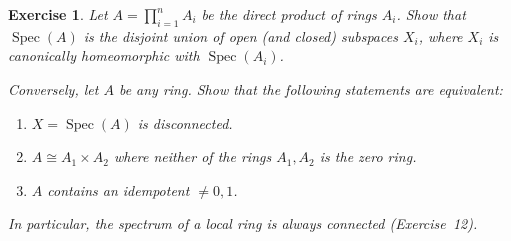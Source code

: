 \documentclass{article}
\theoremstyle{breakstyle}
\newtheorem{exercise}{Exercise}
\DeclareMathOperator{\spec}{Spec}
\begin{document}
\begin{exercise}
Let \(A=\prod_{i=1}^nA_i\) be the direct product of rings \(A_i\). Show that \(\spec(A)\) is the disjoint union of open (and closed) subspaces \(X_i\), where \(X_i\) is canonically homeomorphic with \(\spec(A_i)\).

Conversely, let \(A\) be any ring. Show that the following statements are equivalent:
\begin{enumerate}[label=(\roman*)]
    \item \(X=\spec(A)\) is disconnected.
    \item \(A\cong A_1\times A_2\) where neither of the rings \(A_1,A_2\) is the zero ring.
    \item \(A\) contains an idempotent \(\neq0,1\).
\end{enumerate}
In particular, the spectrum of a local ring is always connected (Exercise~12).


\end{exercise}
\end{document}
